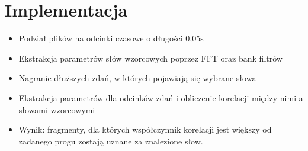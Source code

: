 \section{Implementacja}

\begin{itemize}
	\item Podział plików na odcinki czasowe o długości 0,05s
	\item Ekstrakcja parametrów słów wzorcowych poprzez FFT oraz bank filtrów
	\item Nagranie dłuższych zdań, w których pojawiają się wybrane słowa
	\item Ekstrakcja parametrów dla odcinków zdań i obliczenie korelacji między nimi a słowami wzorcowymi
	\item Wynik: fragmenty, dla których współczynnik korelacji jest większy od zadanego progu zostają uznane za znalezione słow.
\end{itemize}